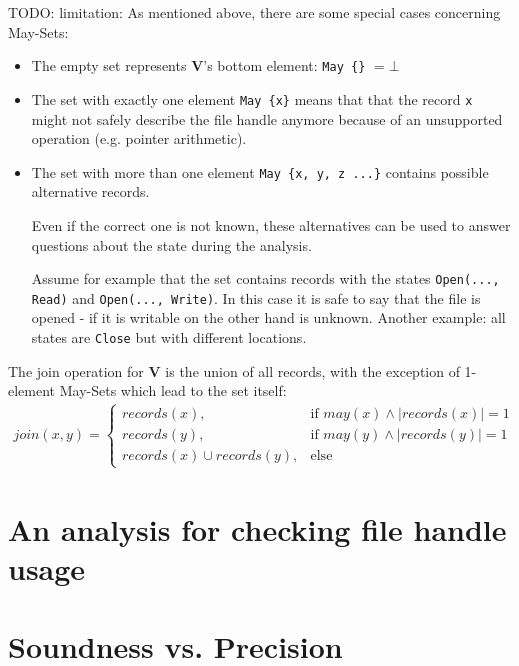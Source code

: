 TODO: limitation:
As mentioned above, there are some special cases concerning May-Sets:
\begin{itemize}
\item The empty set represents \textbf{V}'s bottom element: \verb|May {}| $ = \bot$
\item The set with exactly one element \verb|May {x}| means that that the record \verb|x| might not safely describe the file handle anymore because of an unsupported operation (e.g. pointer arithmetic).
\item The set with more than one element \verb|May {x, y, z ...}| contains possible alternative records. 

Even if the correct one is not known, these alternatives can be used to answer questions about the state during the analysis.

Assume for example that the set contains records with the states \verb|Open(..., Read)| and \verb|Open(..., Write)|. In this case it is safe to say that the file is opened - if it is writable on the other hand is unknown. Another example: all states are \verb|Close| but with different locations. %
\end{itemize}
The join operation for \textbf{V} is the union of all records, with the exception of 1-element May-Sets which lead to the set itself:
\begin{align*}
join(x,y)=\left\{\begin{array}{cl}
records(x), & \mbox{if }may(x) \wedge |records(x)|=1\\
records(y), & \mbox{if }may(y) \wedge |records(y)|=1\\
records(x) \cup records(y), & \mbox{else} \end{array}\right.
\end{align*}


\section{An analysis for checking file handle usage}

\section{Soundness vs. Precision}


